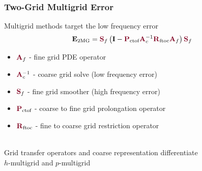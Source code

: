 \documentclass{beamer}
\begin{document}
\begin{frame}
\begin{center}
\frametitle{Two-Grid Multigrid Error}

Multigrid methods target the low frequency error\\

\begin{equation}
\mathbf{E}_{\text{2MG}} = {\color{burgundy}\mathbf{S}}_f \left( \mathbf{I} - {\color{burgundy}\mathbf{P}}_{\text{ctof}} {\color{burgundy}\mathbf{A}}_c^{-1} {\color{burgundy}\mathbf{R}}_{\text{ftoc}} {\color{burgundy}\mathbf{A}}_f \right) {\color{burgundy}\mathbf{S}}_f
\end{equation}

\begin{itemize}

\item ${\color{burgundy}\mathbf{A}}_f$ - fine grid PDE operator

\item ${\color{burgundy}\mathbf{A}}_c^{-1}$ - coarse grid solve (low frequency error)

\item ${\color{burgundy}\mathbf{S}}_f$ - fine grid smoother (high frequency error)

\item ${\color{burgundy}\mathbf{P}}_{\text{ctof}}$ - coarse to fine grid prolongation operator

\item ${\color{burgundy}\mathbf{R}}_{\text{ftoc}}$ - fine to coarse grid restriction operator

\end{itemize}

~\\

Grid transfer operators and coarse representation differentiate\\$h$-multigrid and $p$-multigrid

\end{center}
\end{frame}

\end{document}
